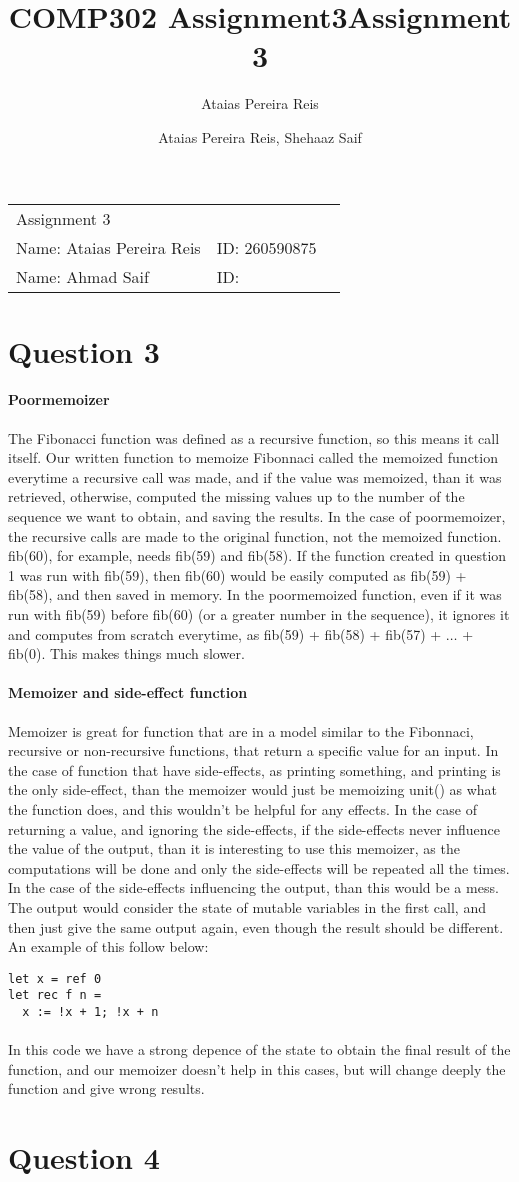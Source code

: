 \documentclass[letterpaper,10pt]{article}
\title{COMP302 Assignment3}
\author{Ataias Pereira Reis}
\title{Assignment 3}
\author{Ataias Pereira Reis, Shehaaz Saif}
\begin{document}
\begin{tabular}{lll}
Assignment 3 & \\
Name: Ataias Pereira Reis & ID: 260590875\\
Name: Ahmad Saif & ID: \\
\end{tabular}

\section*{Question 3}
\paragraph{Poormemoizer} The Fibonacci function was defined as a recursive function, so this means it call itself. Our written function to memoize Fibonnaci called the memoized function everytime a recursive call was made, and if the value was memoized, than it was retrieved, otherwise, computed the missing values up to the number of the sequence we want to obtain, and saving the results. In the case of poormemoizer, the recursive calls are made to the original function, not the memoized function. fib(60), for example, needs fib(59) and fib(58). If the function created in question 1 was run with fib(59), then fib(60) would be easily computed as fib(59) + fib(58), and then saved in memory. In the poormemoized function, even if it was run with fib(59) before fib(60) (or a greater number in the sequence), it ignores it and computes from scratch everytime, as fib(59) + fib(58) + fib(57) + $\ldots$ + fib(0). This makes things much slower.
\paragraph{Memoizer and side-effect function} Memoizer is great for function that are in a model similar to the Fibonnaci, recursive or non-recursive functions, that return a specific value for an input. In the case of function that have side-effects, as printing something, and printing is the only side-effect, than the memoizer would just be memoizing unit() as what the function does, and this wouldn't be helpful for any effects. In the case of returning a value, and ignoring the side-effects, if the side-effects never influence the value of the output, than it is interesting to use this memoizer, as the computations will be done and only the side-effects will be repeated all the times. In the case of the side-effects influencing the output, than this would be a mess. The output would consider the state of mutable variables in the first call, and then just give the same output again, even though the result should be different. An example of this follow below:
\begin{verbatim}
let x = ref 0
let rec f n = 
  x := !x + 1; !x + n
\end{verbatim}
\paragraph{} In this code we have a strong depence of the state to obtain the final result of the function, and our memoizer doesn't help in this cases, but will change deeply the function and give wrong results.
\section*{Question 4}
\end{document}
